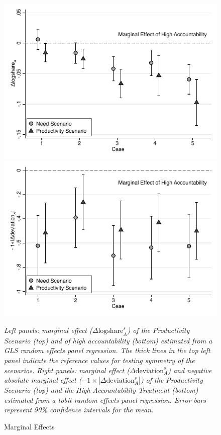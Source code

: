 \documentclass[smallcondensed]{svjour3}
\begin{document}
\begin{figure}[ht!]
   \includegraphics[scale=0.4]{figures/main_marg_share_case.pdf}\includegraphics[scale=0.4]{figures/main_marg_deviation_case.pdf}
   \begin{minipage}{\linewidth}
   \footnotesize
   \emph{Left panels: marginal effect ($\Delta\mbox{logshare}_A^s$) of the Productivity Scenario (top) and of high accountability (bottom) estimated from a GLS random effects panel regression. The thick lines in the top left panel indicate the reference values for testing symmetry of the scenarios. Right panels: marginal effect ($\Delta\mbox{deviation}_A^s$) and negative absolute marginal effect ($-1\times|\Delta\mbox{deviation}_A^s|$) of the Productivity Scenario (top) and the High Accountability Treatment (bottom) estimated from a tobit random effects panel regression. Error bars represent 90\% confidence intervals for the mean.}
   \caption{Marginal Effects}
   \label{fig:marginaleffect}
\end{minipage}
\end{figure}
%
\end{document}
